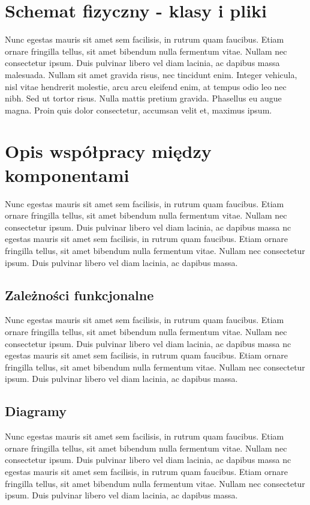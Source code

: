 \section{Schemat fizyczny - klasy i pliki}
Nunc egestas mauris sit amet sem facilisis, in rutrum quam faucibus. Etiam ornare fringilla tellus, sit amet bibendum nulla fermentum vitae. Nullam nec consectetur ipsum. Duis pulvinar libero vel diam lacinia, ac dapibus massa malesuada. Nullam sit amet gravida risus, nec tincidunt enim. Integer vehicula, nisl vitae hendrerit molestie, arcu arcu eleifend enim, at tempus odio leo nec nibh. Sed ut tortor risus. Nulla mattis pretium gravida. Phasellus eu augue magna. Proin quis dolor consectetur, accumsan velit et, maximus ipsum. 

\section{Opis współpracy między komponentami}
Nunc egestas mauris sit amet sem facilisis, in rutrum quam faucibus. Etiam ornare fringilla tellus, sit amet bibendum nulla fermentum vitae. Nullam nec consectetur ipsum. Duis pulvinar libero vel diam lacinia, ac dapibus massa nc egestas mauris sit amet sem facilisis, in rutrum quam faucibus. Etiam ornare fringilla tellus, sit amet bibendum nulla fermentum vitae. Nullam nec consectetur ipsum. Duis pulvinar libero vel diam lacinia, ac dapibus massa.

\subsection{Zależności funkcjonalne}
Nunc egestas mauris sit amet sem facilisis, in rutrum quam faucibus. Etiam ornare fringilla tellus, sit amet bibendum nulla fermentum vitae. Nullam nec consectetur ipsum. Duis pulvinar libero vel diam lacinia, ac dapibus massa nc egestas mauris sit amet sem facilisis, in rutrum quam faucibus. Etiam ornare fringilla tellus, sit amet bibendum nulla fermentum vitae. Nullam nec consectetur ipsum. Duis pulvinar libero vel diam lacinia, ac dapibus massa.

\subsection{Diagramy}
Nunc egestas mauris sit amet sem facilisis, in rutrum quam faucibus. Etiam ornare fringilla tellus, sit amet bibendum nulla fermentum vitae. Nullam nec consectetur ipsum. Duis pulvinar libero vel diam lacinia, ac dapibus massa nc egestas mauris sit amet sem facilisis, in rutrum quam faucibus. Etiam ornare fringilla tellus, sit amet bibendum nulla fermentum vitae. Nullam nec consectetur ipsum. Duis pulvinar libero vel diam lacinia, ac dapibus massa.

